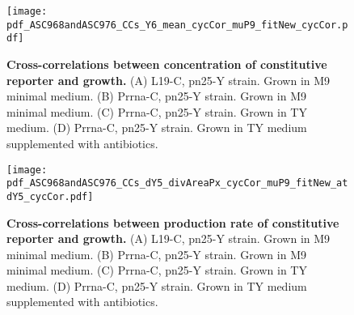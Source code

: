 
\begin{figure}
    \centering
    \texttt{[image: pdf\_ASC968andASC976\_CCs\_Y6\_mean\_cycCor\_muP9\_fitNew\_cycCor.pdf]}
    \caption{ 
        \textbf{Cross-correlations between concentration of constitutive reporter and growth.}
        (A) L19-C, pn25-Y strain. Grown in M9 minimal medium.
        (B) Prrna-C, pn25-Y strain. Grown in M9 minimal medium.
        (C) Prrna-C, pn25-Y strain. Grown in TY medium.
        (D) Prrna-C, pn25-Y strain. Grown in TY medium supplemented with antibiotics.
    }
    \label{fig:ribo:CCsEmuYpn25}
\end{figure}

\begin{figure}
    \centering
    \texttt{[image: pdf\_ASC968andASC976\_CCs\_dY5\_divAreaPx\_cycCor\_muP9\_fitNew\_atdY5\_cycCor.pdf]}
    \caption{ 
        \textbf{Cross-correlations between production rate of constitutive reporter and growth.}
        (A) L19-C, pn25-Y strain. Grown in M9 minimal medium.
        (B) Prrna-C, pn25-Y strain. Grown in M9 minimal medium.
        (C) Prrna-C, pn25-Y strain. Grown in TY medium.
        (D) Prrna-C, pn25-Y strain. Grown in TY medium supplemented with antibiotics.
    }
    \label{fig:ribo:CCsPmuYpn25}
\end{figure}



